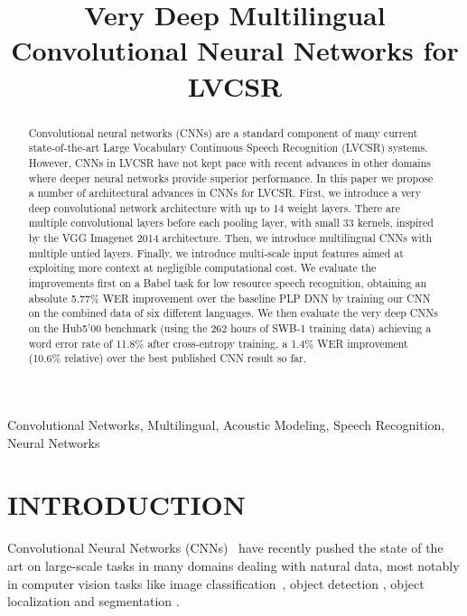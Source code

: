 \documentclass{article}
\title{Very Deep Multilingual Convolutional Neural Networks for LVCSR}
\begin{document}
\ninept
\maketitle
\begin{abstract}
Convolutional neural networks (CNNs) are a standard component of many current state-of-the-art
Large Vocabulary Continuous Speech Recognition (LVCSR) systems.
However, CNNs in LVCSR have not kept pace with recent advances in other domains where
deeper neural networks provide superior performance.
In this paper we propose a number of architectural advances in CNNs for LVCSR.
First, we introduce a very deep convolutional network architecture with up to 14 weight layers.
There are multiple convolutional layers before each pooling layer, 
with small 33 kernels, inspired by the VGG Imagenet 2014 architecture.
Then, we introduce multilingual CNNs with multiple untied layers.
Finally, we introduce multi-scale input features aimed at exploiting more context at negligible computational cost.
We evaluate the improvements first on a Babel task for low resource speech recognition, obtaining an absolute
5.77\% WER improvement over the baseline PLP DNN by training our CNN on the combined data of six different languages.
We then evaluate the very deep CNNs on the Hub5'00 benchmark (using the 262 hours of SWB-1 training data) achieving
a word error rate of 11.8\% after cross-entropy training, 
a 1.4\% WER improvement (10.6\% relative) over the best published CNN result so far.
\end{abstract}
\begin{keywords}
Convolutional Networks, Multilingual, Acoustic Modeling, Speech Recognition, Neural Networks
\end{keywords}
\section{INTRODUCTION}
\label{sec:intro}

Convolutional Neural Networks (CNNs)~\cite{lecun1998gradient} have recently pushed the state of the art
on large-scale tasks in many domains dealing with natural data,
most notably in computer vision tasks like image classification~\cite{krizhevsky2012imagenet, simonyan2014very},
object detection \cite{sermanet2013pedestrian,girshick2014rich}, object localization \cite{sermanet2013overfeat}
and segmentation \cite{farabet2013learning}.
\end{document}
